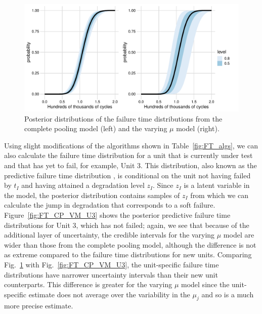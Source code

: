 \begin{figure}[h]
    \centering
    \includegraphics[width=0.95\columnwidth]{./figures/ch-5/FT_dist.pdf}
    \caption{Posterior distributions of the failure time distributions from the complete pooling model (left) and the varying $\mu$ model (right).}
    \label{fig:FT_CP_VM_new}
\end{figure}

Using slight modifications of the algorithms shown in Table~\ref{fig:FT_algs}, we can also calculate the failure time distribution for a unit that is currently under test and that has yet to fail, for example, Unit 3. This distribution, also known as the predictive failure time distribution \citep{lawless2004}, is conditional on the unit not having failed by $t_I$ and having attained a degradation level $z_I$. Since $z_I$ is a latent variable in the model, the posterior distribution contains samples of $z_I$ from which we can calculate the jump in degradation that corresponds to a soft failure. Figure~\ref{fig:FT_CP_VM_U3} shows the posterior predictive failure time distributions for Unit 3, which has not failed; again, we see that because of the additional layer of uncertainty, the credible intervals for the varying $\mu$ model are wider than those from the complete pooling model, although the difference is not as extreme compared to the failure time distributions for new units. Comparing Fig.~\ref{fig:FT_CP_VM_new} with Fig.~\ref{fig:FT_CP_VM_U3}, the unit-specific failure time distributions have narrower uncertainty intervals than their new unit counterparts. This difference is greater for the varying $\mu$ model since the unit-specific estimate does not average over the variability in the $\mu_j$ and so is a much more precise estimate.

